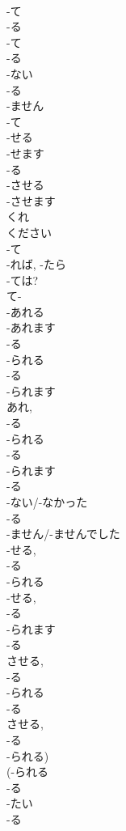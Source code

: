 \documentclass[8pt]{extreport}
\begin{document}
\begin{CJK}{UTF8}{min}
\\	-て 
\\	-る 
\\	-て	
\\	-る 
\\	-ない 
\\	-る 
\\	-ません	
\\	-て 
\\	-せる 
\\	-せます
\\	-る 
\\	-させる 
\\	-させます 
\\	くれ 
\\	ください 
\\	-て 
\\	-れば, -たら 
\\	-ては?
\\	て-
\\	-あれる 
\\	-あれます 
\\	-る 
\\	-られる 
\\	-る 
\\	-られます	
\\	あれ, 
\\	-る 
\\	-られる 
\\	-る 
\\	-られます	
\\	-る 
\\	-ない/-なかった 
\\	-る 
\\	-ません/-ませんでした 
\\	-せる, 
\\	-る 
\\	-られる 
\\	-せる, 
\\	-る 
\\	-られます 
\\	-る 
\\	させる, 
\\	-る 
\\	-られる 
\\	-る 
\\	させる, 
\\	-る 
\\	-られる)
\\	(-られる 
\\	-る 
\\	-たい	
\\	-る 

\end{CJK}
\end{document}
